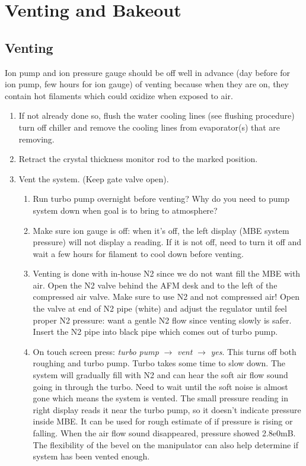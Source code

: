 \chapter{Venting and Bakeout}
\section{Venting}
Ion pump and ion pressure gauge should be off well in advance (day before for ion pump, few hours for ion gauge) of venting because when they are on, they contain hot filaments which could oxidize when exposed to air.
\begin{enumerate}
\item	If not already done so, flush the water cooling lines (see flushing procedure) turn off chiller and remove the cooling lines from evaporator(s) that are removing.
\item	Retract the crystal thickness monitor rod to the marked position.
\item	Vent the system. (Keep gate valve open).
\begin{enumerate}
\item	Run turbo pump overnight before venting? Why do you need to pump system down when goal is to bring to atmosphere?
\item	Make sure ion gauge is off: when it’s off, the left display (MBE system pressure) will not display a reading. If it is not off, need to turn it off and wait a few hours for filament to cool down before venting.
\item	Venting is done with in-house N2 since we do not want fill the MBE with air. Open the N2 valve behind the AFM desk and to the left of the compressed air valve. Make sure to use N2 and not compressed air! Open the valve at end of N2 pipe (white) and adjust the regulator until feel proper N2 pressure: want a gentle N2 flow since venting slowly is safer. Insert the N2 pipe into black pipe which comes out of turbo pump.
\item	On touch screen press: \emph{turbo pump} $\rightarrow$ \emph{vent} $\rightarrow$ \emph{yes}. This turns off both roughing and turbo pump. Turbo takes some time to slow down. The system will gradually fill with N2 and can hear the soft air flow sound going in through the turbo. Need to wait until the soft noise is almost gone which means the system is vented. The small pressure reading in right display reads it near the turbo pump, so it doesn’t indicate pressure inside MBE. It can be used for rough estimate of if pressure is rising or falling. When the air flow sound disappeared, pressure showed 2.8e0mB. The flexibility of the bevel on the manipulator can also help determine if system has been vented enough.
\end{enumerate}
\end{enumerate}

